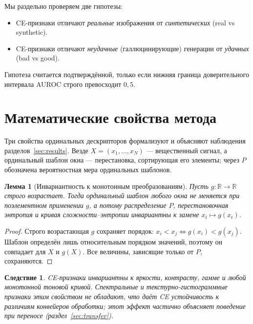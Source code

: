 \documentclass[14pt]{extarticle}
\theoremstyle{plain}
\newtheorem{lemma}{Лемма}
\newtheorem{corollary}{Следствие}
\numberwithin{equation}{section}
\numberwithin{figure}{section}
\numberwithin{table}{section}
\begin{document}
Мы раздельно проверяем две гипотезы:
\begin{itemize}
\item[\textbf{H1.}] CE-признаки отличают \emph{реальные} изображения от
      \emph{синтетических} (real vs synthetic).
\item[\textbf{H2.}] CE-признаки отличают \emph{неудачные} (галлюцинирующие)
      генерации от \emph{удачных} (bad vs good).
\end{itemize}
Гипотеза считается подтверждённой, только если нижняя граница доверительного
интервала AUROC строго превосходит $0{,}5$.

\section{Математические свойства метода}\label{sec:theory}

Три свойства ординальных дескрипторов формализуют и объясняют наблюдения
разделов~\ref{sec:results}. Везде $X=(x_1,\dots,x_N)$ — вещественный сигнал,
а ординальный шаблон окна — перестановка, сортирующая его элементы; через $P$
обозначена вероятностная мера ординальных шаблонов.

\begin{lemma}[Инвариантность к монотонным преобразованиям]\label{lem:mono}
Пусть $g:\mathbb{R}\to\mathbb{R}$ строго возрастает. Тогда ординальный шаблон
любого окна не меняется при поэлементном применении $g$, а потому распределение
$P$, перестановочная энтропия и кривая сложности–энтропии инвариантны к замене
$x_t\mapsto g(x_t)$.
\end{lemma}
\begin{proof}
Строго возрастающая $g$ сохраняет порядок: $x_i<x_j\iff g(x_i)<g(x_j)$. Шаблон
определён лишь относительным порядком значений, поэтому он совпадает для $X$ и
$g(X)$. Все величины, зависящие только от $P$, сохраняются. \qedhere
\end{proof}

\begin{corollary}\label{cor:mono}
CE-признаки инвариантны к яркости, контрасту, гамме и любой монотонной тоновой
кривой. Спектральные и текстурно-гистограммные признаки этим свойством не
обладают, что даёт CE устойчивость к различиям конвейеров обработки; этот эффект
частично объясняет поведение при переносе (раздел~\ref{sec:transfer}).
\end{corollary}
\end{document}
